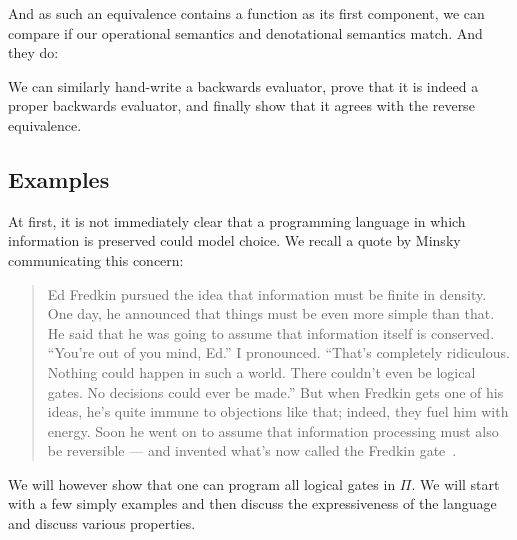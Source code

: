 \documentclass{article}
\begin{document}
\noindent And as such an equivalence contains a function as
its first component, we can compare if our operational
semantics and denotational semantics match.  And they do:
\begin{code}\hspace*{-4mm}
\> \AgdaSymbol{:} \<[10]%
\>[10]\AgdaSymbol{\{}  \AgdaSymbol{:}
\AgdaSymbol{\}}  \AgdaSymbol{(}
\AgdaSymbol{:}   \AgdaSymbol{)}
 \AgdaSymbol{(} \AgdaSymbol{:} 
 \AgdaSymbol{)} 
   
 \AgdaSymbol{(}
\AgdaSymbol{)} \<%
\end{code}

\noindent We can similarly hand-write a backwards evaluator,
prove that it is indeed a proper backwards evaluator, and
finally show that it agrees with the reverse equivalence.

\subsection{Examples}
\label{sec:langRev-examples}
\label{examples}

At first, it is not immediately clear that a programming language
in which information is preserved could model choice. We recall a
quote by Minsky communicating this concern:

\begin{quote}
  Ed Fredkin pursued the idea that information must be finite in
  density. One day, he announced that things must be even more simple
  than that. He said that he was going to assume that information
  itself is conserved. “You’re out of you mind, Ed.” I
  pronounced. “That’s completely ridiculous. Nothing could happen in
  such a world. There couldn’t even be logical gates. No decisions
  could ever be made.” But when Fredkin gets one of his ideas, he’s
  quite immune to objections like that; indeed, they fuel him with
  energy. Soon he went on to assume that information processing must
  also be reversible — and invented what’s now called the Fredkin
  gate~\cite{Hey:1999:FCE:304763}. 
\end{quote}

We will however show that one can program all logical gates in
$\Pi$. We will start with a few simply examples and then discuss the
expressiveness of the language and discuss various properties.
\end{document}
